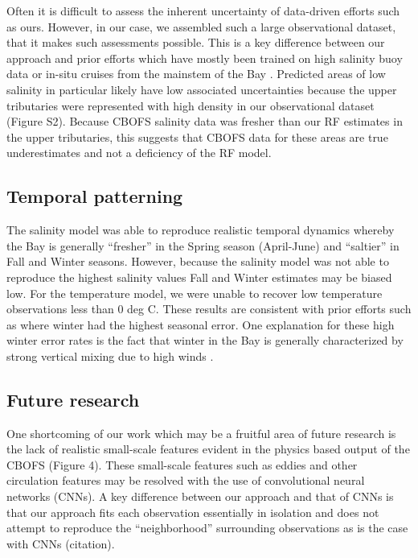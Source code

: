 \documentclass{article}
\begin{document}
Often it is difficult to assess the inherent uncertainty of data-driven efforts such as ours. However, in our case, we assembled such a large observational dataset, that it makes such assessments possible. This is a key difference between our approach and prior efforts which have mostly been trained on high salinity buoy data or in-situ cruises from the mainstem of the Bay \citep{vogelAssessingSatelliteSea2016, geigerSatellitederivedCoastalOcean2013}. Predicted areas of low salinity in particular likely have low associated uncertainties because the upper tributaries were represented with high density in our observational dataset (Figure S2). Because CBOFS salinity data was fresher than our RF estimates in the upper tributaries, this suggests that CBOFS data for these areas are true underestimates and not a deficiency of the RF model.


\subsection{Temporal patterning}

The salinity model was able to reproduce realistic temporal dynamics whereby the Bay is generally “fresher” in the Spring season (April-June) and “saltier” in Fall and Winter seasons. However, because the salinity model was not able to reproduce the highest salinity values Fall and Winter estimates may be biased low. For the temperature model, we were unable to recover low temperature observations less than 0 deg C. These results are consistent with prior efforts such as \citet{geigerSatellitederivedCoastalOcean2013} where winter had the highest seasonal error. One explanation for these high winter error rates is the fact that winter in the Bay is generally characterized by strong vertical mixing due to high winds \citep{sonWaterPropertiesChesapeake2012, xuClimateForcingSalinity2012}.

\subsection{Future research}

One shortcoming of our work which may be a fruitful area of future research is the lack of realistic small-scale features evident in the physics based output of the CBOFS (Figure 4). These small-scale features such as eddies and other circulation features may be resolved with the use of convolutional neural networks (CNNs). A key difference between our approach and that of CNNs is that our approach fits each observation essentially in isolation and does not attempt to reproduce the “neighborhood” surrounding observations as is the case with CNNs (citation). 
\end{document}
